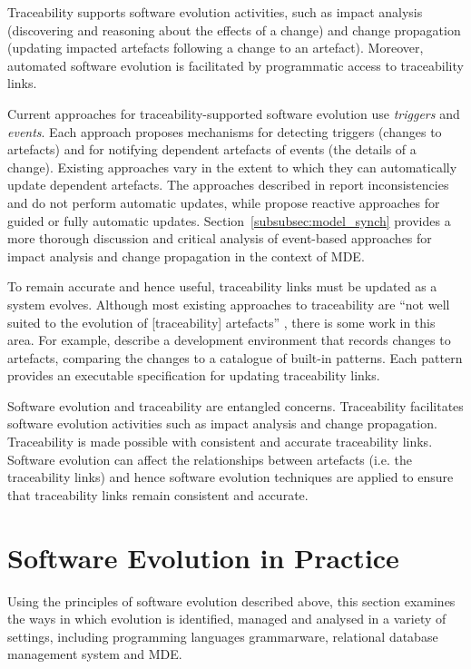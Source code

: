 Traceability supports software evolution activities, such as impact analysis (discovering and reasoning about the effects of a change) and change propagation (updating impacted artefacts following a change to an artefact). Moreover, automated software evolution is facilitated by programmatic access to traceability links.

Current approaches for traceability-supported software evolution use \emph{triggers} and \emph{events}. Each approach proposes mechanisms for detecting triggers (changes to artefacts) and for notifying dependent artefacts of events (the details of a change). Existing approaches vary in the extent to which they can automatically update dependent artefacts. The approaches described in \cite{chen99consistency,cleland03eventbased} report inconsistencies and do not perform automatic updates, while \cite{aizenbud05operational,costa2007rtmdd} propose reactive approaches for guided or fully automatic updates. Section~\ref{subsubsec:model_synch} provides a more thorough discussion and critical analysis of event-based approaches for impact analysis and change propagation in the context of MDE.

To remain accurate and hence useful, traceability links must be updated as a system evolves. Although most existing approaches to traceability are ``not well suited to the evolution of [traceability] artefacts'' \cite[pg. 24]{winkler09survey}, there is some work in this area. For example, \cite{mader08rule} describe a development environment that records changes to artefacts, comparing the changes to a catalogue of built-in patterns. Each pattern provides an executable specification for updating traceability links.

Software evolution and traceability are entangled concerns. Traceability facilitates software evolution activities such as impact analysis and change propagation. Traceability is made possible with consistent and accurate traceability links. Software evolution can affect the relationships between artefacts (i.e. the traceability links) and hence software evolution techniques are applied to ensure that traceability links remain consistent and accurate.

\section{Software Evolution in Practice}
\label{sec:software_evolution_practice}
Using the principles of software evolution described above, this section examines the ways in which evolution is identified, managed and analysed in a variety of settings, including programming languages grammarware, relational database management system and MDE. 


